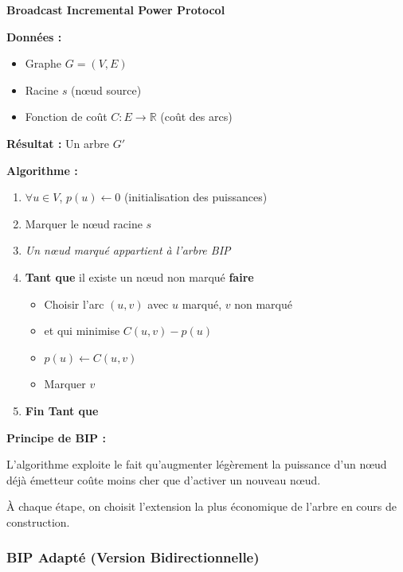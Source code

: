 \documentclass[12pt,a4paper]{article}
\begin{document}
\begin{algorithme}
\textbf{Broadcast Incremental Power Protocol}

\textbf{Données :} 
\begin{itemize}
    \item Graphe $G = (V, E)$
    \item Racine $s$ (nœud source)
    \item Fonction de coût $C : E \to \mathbb{R}$ (coût des arcs)
\end{itemize}

\textbf{Résultat :} Un arbre $G'$

\textbf{Algorithme :}
\begin{enumerate}
    \item $\forall u \in V$, $p(u) \leftarrow 0$ (initialisation des puissances)
    \item Marquer le nœud racine $s$
    \item \textit{Un nœud marqué appartient à l'arbre BIP}
    \item \textbf{Tant que} il existe un nœud non marqué \textbf{faire}
    \begin{itemize}
        \item Choisir l'arc $(u, v)$ avec $u$ marqué, $v$ non marqué
        \item et qui minimise $C(u, v) - p(u)$
        \item $p(u) \leftarrow C(u, v)$
        \item Marquer $v$
    \end{itemize}
    \item \textbf{Fin Tant que}
\end{enumerate}
\end{algorithme}

\begin{notecours}
\textbf{Principe de BIP :}

L'algorithme exploite le fait qu'augmenter légèrement la puissance d'un nœud déjà émetteur coûte moins cher que d'activer un nouveau nœud.

À chaque étape, on choisit l'extension la plus économique de l'arbre en cours de construction.
\end{notecours}

\subsubsection{BIP Adapté (Version Bidirectionnelle)}
\end{document}
